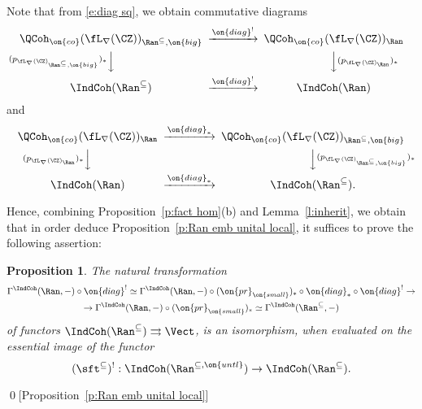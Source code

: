 \documentclass[9pt]{amsart}
\newtheorem{prop}[subsubsection]{Proposition}
\theoremstyle{remark}
\theoremstyle{definition}
\theoremstyle{remark}
\newcommand{\lemref}[1]{Lemma~\ref{#1}}
\newcommand{\propref}[1]{Proposition~\ref{#1}}
\numberwithin{equation}{section}
\begin{document}
\sssec{}

Note that from \eqref{e:diag sq}, we obtain commutative diagrams
$$
\CD 
\QCoh_{\on{co}}(\fL_\nabla(\CZ))_{\Ran^{\subseteq},\on{big}} @>{\on{diag}^!}>> \QCoh_{\on{co}}(\fL_\nabla(\CZ))_\Ran \\
@V{(p_{\fL_\nabla(\CZ)_{\Ran^{\subseteq},\on{big}}})_*}VV @VV{(p_{\fL_\nabla(\CZ)_\Ran})_*}V \\
\IndCoh(\Ran^{\subseteq}) @>{\on{diag}^!}>>  \IndCoh(\Ran) 
\endCD
$$
and
$$
\CD 
\QCoh_{\on{co}}(\fL_\nabla(\CZ))_\Ran @>{\on{diag}_*}>> \QCoh_{\on{co}}(\fL_\nabla(\CZ))_{\Ran^{\subseteq},\on{big}}  \\
@V{(p_{\fL_\nabla(\CZ)_\Ran})_*}VV @VV{(p_{\fL_\nabla(\CZ)_{\Ran^{\subseteq},\on{big}}})_*}V \\
\IndCoh(\Ran)  @>{\on{diag}_*}>> \IndCoh(\Ran^{\subseteq}). 
\endCD
$$

\medskip

Hence, combining \propref{p:fact hom}(b) and \lemref{l:inherit}, we obtain that in order deduce \propref{p:Ran emb unital local},
it suffices to prove the following assertion:

\begin{prop} \label{p:diag cofinal}
The natural transformation 
\begin{multline*} 
\Gamma^{\IndCoh}(\Ran,-)\circ \on{diag}^! \simeq \Gamma^{\IndCoh}(\Ran,-)\circ (\on{pr}_{\on{small}})_*\circ \on{diag}_* \circ \on{diag}^! \to \\
\to \Gamma^{\IndCoh}(\Ran,-)\circ  (\on{pr}_{\on{small}})_*\simeq \Gamma^{\IndCoh}(\Ran^{\subseteq},-)
\end{multline*}
of functors $\IndCoh(\Ran^{\subseteq})\rightrightarrows  \Vect$, is an isomorphism, when evaluated 
on the essential image of the functor 
$$(\sft^{\subseteq})^!:\IndCoh(\Ran^{\subseteq,\on{untl}})\to \IndCoh(\Ran^{\subseteq}).$$
\end{prop}

\qed[\propref{p:Ran emb unital local}]
\end{document}
